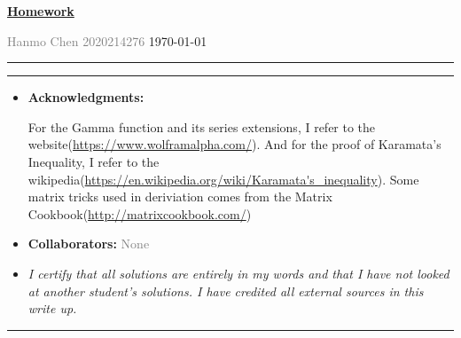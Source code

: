 \documentclass[a4paper]{article}
\begin{document}
\courseheader



\setcounter{hwcnt}{2} %

\begin{center}
  \underline{\bf Homework \thehwcnt} \\
\end{center}
\begin{flushleft}
  \textcolor{gray}{Hanmo Chen 2020214276}\hfill
  \today
\end{flushleft}
\hrule

\vspace{2em}

\flushleft
\rule{\textwidth}{1pt}
\begin{itemize}
\item {\bf Acknowledgments: \/} 

  For the Gamma function and its series extensions, I refer to the website(\url{https://www.wolframalpha.com/}). And for the proof of Karamata's Inequality, I refer to the wikipedia(\url{https://en.wikipedia.org/wiki/Karamata's_inequality}). Some matrix tricks used in deriviation comes from the Matrix Cookbook(\url{http://matrixcookbook.com/})
\item {\bf Collaborators: \/}
  \textcolor{gray}{None}

\item  \emph{I certify that all solutions are entirely in my words and that I have not looked at another student's solutions. I have credited all external sources in this write up.}
  \framebox[\linewidth]{\rule{0pt}{10pt}\textcolor{gray}{\large Hanmo Chen}}
\end{itemize}
\rule{\textwidth}{1pt}


\vspace{2em}
\end{document}
